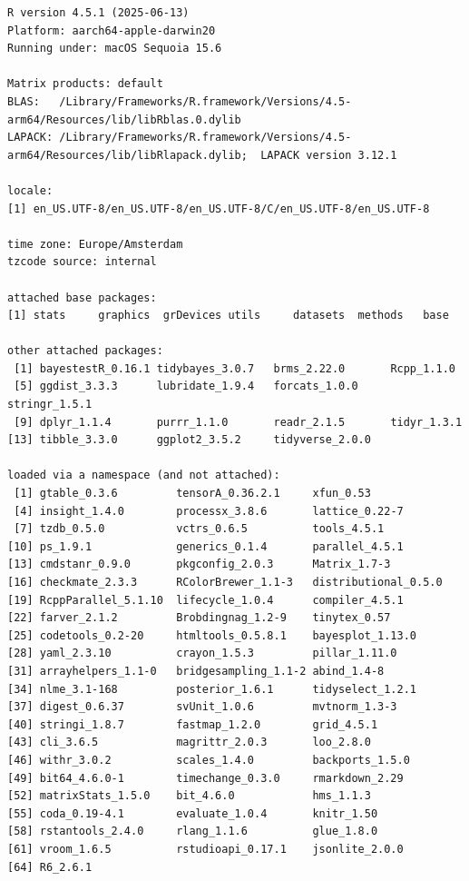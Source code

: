 \documentclass[
  doc,
  floatsintext,
  longtable,
  nolmodern,
  notxfonts,
  notimes,
  colorlinks=true,linkcolor=blue,citecolor=blue,urlcolor=blue]{apa7}
\begin{document}
\begin{verbatim}
R version 4.5.1 (2025-06-13)
Platform: aarch64-apple-darwin20
Running under: macOS Sequoia 15.6

Matrix products: default
BLAS:   /Library/Frameworks/R.framework/Versions/4.5-arm64/Resources/lib/libRblas.0.dylib 
LAPACK: /Library/Frameworks/R.framework/Versions/4.5-arm64/Resources/lib/libRlapack.dylib;  LAPACK version 3.12.1

locale:
[1] en_US.UTF-8/en_US.UTF-8/en_US.UTF-8/C/en_US.UTF-8/en_US.UTF-8

time zone: Europe/Amsterdam
tzcode source: internal

attached base packages:
[1] stats     graphics  grDevices utils     datasets  methods   base     

other attached packages:
 [1] bayestestR_0.16.1 tidybayes_3.0.7   brms_2.22.0       Rcpp_1.1.0       
 [5] ggdist_3.3.3      lubridate_1.9.4   forcats_1.0.0     stringr_1.5.1    
 [9] dplyr_1.1.4       purrr_1.1.0       readr_2.1.5       tidyr_1.3.1      
[13] tibble_3.3.0      ggplot2_3.5.2     tidyverse_2.0.0  

loaded via a namespace (and not attached):
 [1] gtable_0.3.6         tensorA_0.36.2.1     xfun_0.53           
 [4] insight_1.4.0        processx_3.8.6       lattice_0.22-7      
 [7] tzdb_0.5.0           vctrs_0.6.5          tools_4.5.1         
[10] ps_1.9.1             generics_0.1.4       parallel_4.5.1      
[13] cmdstanr_0.9.0       pkgconfig_2.0.3      Matrix_1.7-3        
[16] checkmate_2.3.3      RColorBrewer_1.1-3   distributional_0.5.0
[19] RcppParallel_5.1.10  lifecycle_1.0.4      compiler_4.5.1      
[22] farver_2.1.2         Brobdingnag_1.2-9    tinytex_0.57        
[25] codetools_0.2-20     htmltools_0.5.8.1    bayesplot_1.13.0    
[28] yaml_2.3.10          crayon_1.5.3         pillar_1.11.0       
[31] arrayhelpers_1.1-0   bridgesampling_1.1-2 abind_1.4-8         
[34] nlme_3.1-168         posterior_1.6.1      tidyselect_1.2.1    
[37] digest_0.6.37        svUnit_1.0.6         mvtnorm_1.3-3       
[40] stringi_1.8.7        fastmap_1.2.0        grid_4.5.1          
[43] cli_3.6.5            magrittr_2.0.3       loo_2.8.0           
[46] withr_3.0.2          scales_1.4.0         backports_1.5.0     
[49] bit64_4.6.0-1        timechange_0.3.0     rmarkdown_2.29      
[52] matrixStats_1.5.0    bit_4.6.0            hms_1.1.3           
[55] coda_0.19-4.1        evaluate_1.0.4       knitr_1.50          
[58] rstantools_2.4.0     rlang_1.1.6          glue_1.8.0          
[61] vroom_1.6.5          rstudioapi_0.17.1    jsonlite_2.0.0      
[64] R6_2.6.1            
\end{verbatim}
\end{document}
